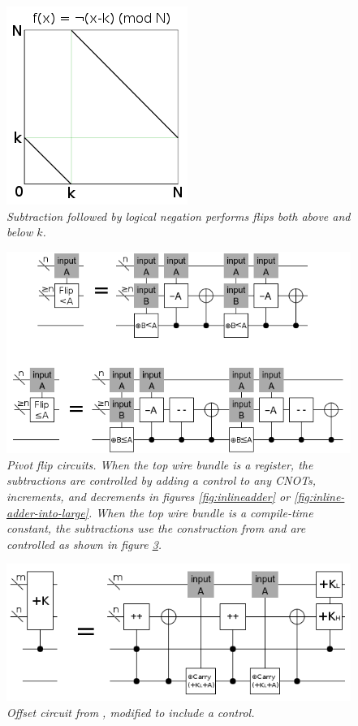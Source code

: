 \documentclass[twocolumn]{article}
\begin{document}
\begin{figure}
  \centering
  \includegraphics[totalheight=4cm]{double-flip.png}
  \caption{\em Subtraction followed by logical negation performs flips both above and below $k$.}
  \label{fig:double-flip}
\end{figure}

\begin{figure}
  \centering
  \includegraphics[totalheight=4.5cm]{pivot-flip.png}
  \caption{\em Pivot flip circuits.
  When the top wire bundle is a register, the subtractions are controlled by adding a control to any CNOTs, increments, and decrements in figures \ref{fig:inlineadder} or \ref{fig:inline-adder-into-large}.
  When the top wire bundle is a compile-time constant, the subtractions use the construction from \cite{haner2016} and are controlled as shown in figure \ref{fig:controlled-offset}.}
  \label{fig:const-pivot-flip}
\end{figure}

\begin{figure}
  \centering
  \includegraphics[totalheight=3.1cm]{controlled-offset.png}
  \caption{\em Offset circuit from \cite{haner2016}, modified to include a control.}
  \label{fig:controlled-offset}
\end{figure}
\end{document}
